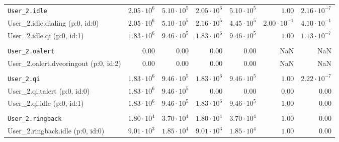 \begin{table}[htbp]
{\begin{tabular}{lrrrrrr}
\\[-8pt]\texttt{User\_2.idle}                        & $2.05 \cdot 10^{6}$ & $5.10 \cdot 10^{5}$ & $2.05 \cdot 10^{6}$ & $5.10 \cdot 10^{5}$ &               $1.00$ & $2.16 \cdot 10^{-7}$ \\
\hspace{3mm}User\_2.idle.dialing (p:0, id:0)         & $2.05 \cdot 10^{6}$ & $5.10 \cdot 10^{5}$ & $2.16 \cdot 10^{5}$ & $4.45 \cdot 10^{5}$ & $2.00 \cdot 10^{-1}$ & $4.10 \cdot 10^{-1}$ \\
\hspace{3mm}User\_2.idle.qi (p:0, id:1)              & $1.83 \cdot 10^{6}$ & $9.46 \cdot 10^{5}$ & $1.83 \cdot 10^{6}$ & $9.46 \cdot 10^{5}$ &               $1.00$ & $1.13 \cdot 10^{-7}$ \\
\\[-8pt]\texttt{User\_2.oalert}                      &              $0.00$ &              $0.00$ &              $0.00$ &              $0.00$ &                  NaN &                  NaN \\
\hspace{3mm}User\_2.oalert.dveoringout (p:0, id:2)   &              $0.00$ &              $0.00$ &              $0.00$ &              $0.00$ &                  NaN &                  NaN \\
\\[-8pt]\texttt{User\_2.qi}                          & $1.83 \cdot 10^{6}$ & $9.46 \cdot 10^{5}$ & $1.83 \cdot 10^{6}$ & $9.46 \cdot 10^{5}$ &               $1.00$ & $2.22 \cdot 10^{-7}$ \\
\hspace{3mm}User\_2.qi.talert (p:0, id:0)            & $1.83 \cdot 10^{6}$ & $9.46 \cdot 10^{5}$ &              $0.00$ &              $0.00$ &               $0.00$ &               $0.00$ \\
\hspace{3mm}User\_2.qi.idle (p:0, id:1)              & $1.83 \cdot 10^{6}$ & $9.46 \cdot 10^{5}$ & $1.83 \cdot 10^{6}$ & $9.46 \cdot 10^{5}$ &               $1.00$ &               $0.00$ \\
\\[-8pt]\texttt{User\_2.ringback}                    & $1.80 \cdot 10^{4}$ & $3.70 \cdot 10^{4}$ & $1.80 \cdot 10^{4}$ & $3.70 \cdot 10^{4}$ &               $1.00$ &               $0.00$ \\
\hspace{3mm}User\_2.ringback.idle (p:0, id:0)        & $9.01 \cdot 10^{3}$ & $1.85 \cdot 10^{4}$ & $9.01 \cdot 10^{3}$ & $1.85 \cdot 10^{4}$ &               $1.00$ &               $0.00$ \\

\end{tabular}}
\end{table}
